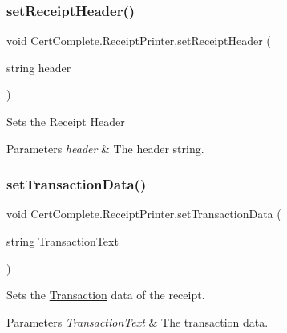 \subsubsection{\texorpdfstring{set\+Receipt\+Header()}{setReceiptHeader()}}
{\footnotesize\ttfamily void Cert\+Complete.\+Receipt\+Printer.\+set\+Receipt\+Header (\begin{DoxyParamCaption}\item[{string}]{header }\end{DoxyParamCaption})\hspace{0.3cm}{\ttfamily [inline]}}



Sets the Receipt Header 


\begin{DoxyParams}{Parameters}
{\em header} & The header string.\\
\hline
\end{DoxyParams}
\mbox{\label{class_cert_complete_1_1_receipt_printer_ab2d4ed5e88261754c3fc64710fa65a64}} 
\subsubsection{\texorpdfstring{set\+Transaction\+Data()}{setTransactionData()}\hspace{0.1cm}{\footnotesize\ttfamily [1/2]}}
{\footnotesize\ttfamily void Cert\+Complete.\+Receipt\+Printer.\+set\+Transaction\+Data (\begin{DoxyParamCaption}\item[{string}]{Transaction\+Text }\end{DoxyParamCaption})\hspace{0.3cm}{\ttfamily [inline]}}



Sets the \mbox{\hyperlink{class_cert_complete_1_1_transaction}{Transaction}} data of the receipt. 


\begin{DoxyParams}{Parameters}
{\em Transaction\+Text} & The transaction data.\\
\hline
\end{DoxyParams}
\mbox{\label{class_cert_complete_1_1_receipt_printer_af557b68b0786ec70501f8d56c39c1168}} 
